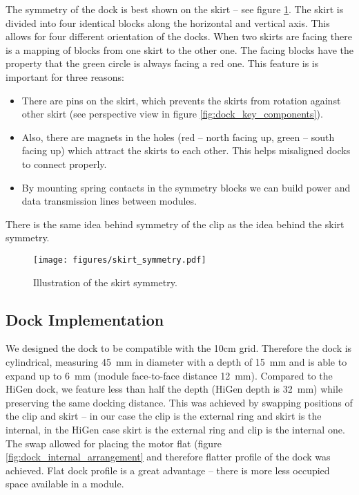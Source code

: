The symmetry of the dock is best shown on the skirt -- see figure
\ref{fig:dock_skirt_symmetry}. The skirt is divided into four identical blocks
along the horizontal and vertical axis. This allows for four different
orientation of the docks. When two skirts are facing there is a mapping of
blocks from one skirt to the other one. The facing blocks have the property that
the green circle is always facing a red one. This feature is is important for
three reasons:
\begin{itemize}
    \item There are pins on the skirt, which prevents the skirts from
    rotation against other skirt (see perspective view in figure
    \ref{fig:dock_key_components}).
    \item Also, there are magnets in the holes (red -- north facing up, green --
    south facing up) which attract the skirts to each other. This helps
    misaligned docks to connect properly.
    \item By mounting spring contacts in the symmetry blocks we can build
    power and data transmission lines between modules.
\end{itemize}
There is the same idea behind symmetry of the clip as the idea behind the skirt
symmetry.

\begin{figure}[!ht]
    \centering
    \texttt{[image: figures/skirt\_symmetry.pdf]}
    \caption{Illustration of the skirt symmetry.}
    \label{fig:dock_skirt_symmetry}
\end{figure}

\subsection{Dock Implementation}

We designed the dock to be compatible with the 10cm grid. Therefore the dock is
cylindrical, measuring 45~mm in diameter with a depth of 15~mm and is able to
expand up to 6~mm (module face-to-face distance 12~mm). Compared to the HiGen
dock, we feature less than half the depth (HiGen depth is 32~mm) while
preserving the same docking distance. This was achieved by swapping positions of
the clip and skirt -- in our case the clip is the external ring and skirt is the
internal, in the HiGen case skirt is the external ring and clip is the internal
one. The swap allowed for placing the motor flat (figure
\ref{fig:dock_internal_arrangement} and therefore flatter profile of the dock
was achieved. Flat dock profile is a great advantage -- there is more less
occupied space available in a module.

